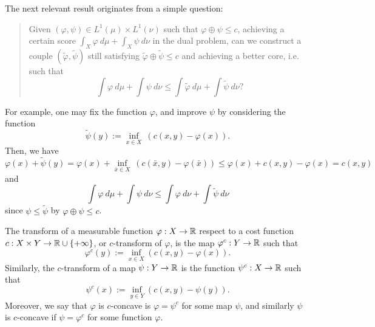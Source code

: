 \documentclass[../main.tex]{subfiles}
\begin{document}
\vspace{10pt}
\noindent
The next relevant result originates from a simple question: 
\begin{quote}
Given $(\varphi, \psi)\in L^1(\mu)\times L^1(\nu)$ such that $\varphi\oplus\psi\leq c$, achieving a certain score $\int_X \varphi \ d\mu + \int_X \psi \ d\nu$ in the dual problem, can we construct a couple $(\tilde \varphi, \tilde \psi)$ still satisfying $\tilde\varphi\oplus\tilde\psi\leq c$ and achieving a better core, i.e. such that 
$$
\int \varphi \ d\mu + \int \psi \ d\nu
\leq 
\int \tilde\varphi \ d\mu + \int \tilde\psi \ d\nu ?
$$
\end{quote}
For example, one may fix the function $\varphi$, and improve $\psi$ by considering the function
$$
\tilde\psi(y) := \inf_{x\in X} \ (c(x, y) - \varphi(x)).
$$
Then, we have
$$
\varphi(x) + \tilde \psi(y) 
= \varphi(x) + \inf_{\bar x\in X} \ (c(\bar x, y) - \varphi(\bar x))
\leq \varphi(x) + c(x, y) - \varphi(x) 
= c(x, y)
$$
and
$$
\int \varphi \ d\mu + \int \psi \ d\nu \leq \int\varphi \ d\nu + \int \tilde\psi \ d\nu 
$$
since $\psi\leq\tilde\psi$ by $\varphi \oplus \psi \leq c$.

\begin{definition}
    The transform of a measurable function $\varphi : X \to \mathbb{R}$ respect to a cost function $c: X \times Y \to \mathbb{R}\cup\{+\infty\}$, or $c$-transform of $\varphi$, is the map $\varphi^c: Y \to \mathbb{R}$ such that $$\varphi^c(y) := \inf_{x\in X} (c(x, y) - \varphi(x)).$$
    Similarly, the $c$-transform of a map $\psi: Y \to \mathbb{R}$ is the function $\psi^c : X \to \mathbb{R}$ such that $$\psi^c(x) := \inf_{y\in Y} (c(x, y) - \psi(y)).$$
    Moreover, we say that $\varphi$ is $c$-concave is $\varphi = \psi^c$ for some map $\psi$, and similarly $\psi$ is $c$-concave if $\psi = \varphi^c$ for some function $\varphi$.
\end{definition}
\end{document}
